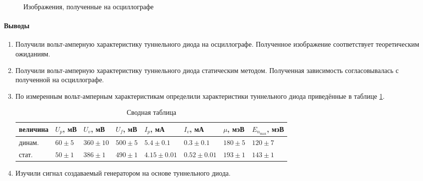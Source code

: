 \documentclass[a4paper,12pt]{article}
\begin{document}
\begin{figure}[h]
\begin{minipage}[h]{0.49\linewidth}
\end{minipage}
\caption{Изображения, полученные на осциллографе}
\label{ris:image1}
\end{figure}
\paragraph{Выводы}

\begin{enumerate}
\item Получили вольт-амперную характеристику туннельного диода на осциллографе. Полученное изображение соответствует теоретическим ожиданиям.
\item Получили вольт-амперную характеристику туннельного диода статическим методом. Полученная зависимость согласовывалась с полученной на осциллографе.
\item По измеренным вольт-амперным характеристикам определили характеристики туннельного диода приведённые в таблице \ref{tab:results}.

\begin{table}[h]
\centering
\small
\begin{tabular}{|l|l|l|l|l|l|l|l|}
\hline
величина & $U_p$, мВ  & $U_v$, мВ    & $U_f$, мВ   & $I_p$, мА       & $I_v$, мА       & $\mu$, мэВ  & $E_{n_{\max}}$, мэВ \\ \hline
динам.   & $60 \pm 5$ & $360 \pm 10$ & $500 \pm 5$ & $5.4 \pm 0.1$   & $0.3 \pm 0.1$   & $180 \pm 5$ & $120 \pm 7$         \\ \hline
стат.    & $50 \pm 1$ & $386 \pm 1$  & $490 \pm 1$ & $4.15 \pm 0.01$ & $0.52 \pm 0.01$ & $193 \pm 1$ & $143 \pm 1$         \\ \hline
\end{tabular}
\caption{Сводная таблица}
\label{tab:results}
\end{table}

\item Изучили сигнал создаваемый генератором на основе туннельного диода.
\end{enumerate}
\end{document}
